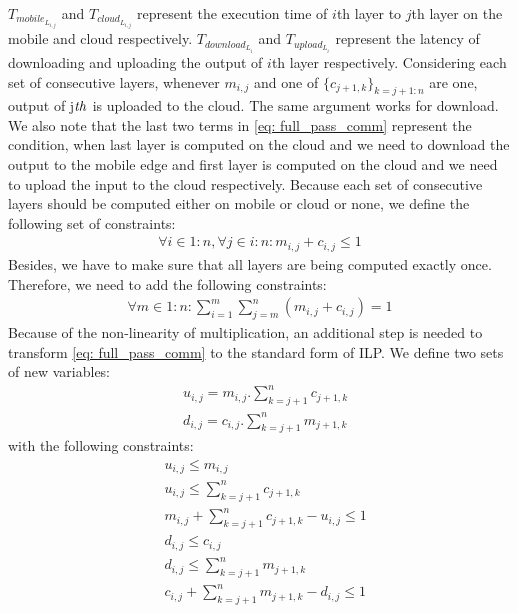 \documentclass[conference,9pt]{IEEEtran}
\begin{document}
$T_{mobile_{L_{i,j}}}$ and $T_{cloud_{L_{i,j}}}$ represent the execution time of $i$th layer to $j$th layer on the mobile and cloud respectively. $T_{download_{L_i}}$ and $T_{upload_{L_i}}$ represent the latency of downloading and uploading the output of $i$th layer respectively. Considering each set of consecutive layers, whenever $m_{i,j}$ and one of $\{c_{j+1,k}\}_{k=j+1:n}$ are one, output of j$\it{th}$ is uploaded to the cloud. The same argument works for download.
We also note that the last two terms in \eqref{eq: full_pass_comm} represent the condition, when last layer is computed on the cloud and we need to download the output to the mobile edge and first layer is computed on the cloud and we need to upload the input to the cloud respectively. Because each set of consecutive layers should be computed either on mobile or cloud or none, we define the following set of constraints:
  \begin{equation}
      \begin{split}
\forall i \in {1:n}, \forall j \in {i:n}:  m_{i,j} + c_{i,j} \leq 1 \label{eq: layers_constraints}
  \end{split}
\end{equation}
Besides, we have to make sure that all layers are being computed exactly once. Therefore, we need to add the following constraints:
  \begin{equation}
      \begin{split}
\forall m \in {1:n}: \sum_{i=1}^{m}{\sum_{j=m}^{n}{(m_{i,j} + c_{i,j})}} = 1
  \end{split}
\end{equation}
Because of the non-linearity of multiplication, an additional step is needed to transform \eqref{eq: full_pass_comm} to the standard form of ILP. We define two sets of new variables: \\
 \begin{equation}\label{eq: download_upload_binary_var} 
 \begin{aligned}
&u_{i,j} = m_{i,j}.\sum_{k=j+1}^{n}{c_{j+1,k}} \\
&d_{i,j} = c_{i,j}.\sum_{k=j+1}^{n}{m_{j+1,k}}
 \end{aligned}\end{equation}
with the following constraints:
\begin{equation}\label{eq: download_upload_constraints} 
 \begin{aligned}
&u_{i,j} \leq m_{i,j}\\
&u_{i,j} \leq \sum_{k=j+1}^{n}{c_{j+1,k}} \\
&m_{i,j} + \sum_{k=j+1}^{n}{c_{j+1,k}} - u_{i,j} \leq 1\\
&d_{i,j} \leq c_{i,j}\\
&d_{i,j} \leq \sum_{k=j+1}^{n}{m_{j+1,k}} \\
&c_{i,j} + \sum_{k=j+1}^{n}{m_{j+1,k}} - d_{i,j} \leq 1
 \end{aligned}
 \end{equation}
\end{document}
